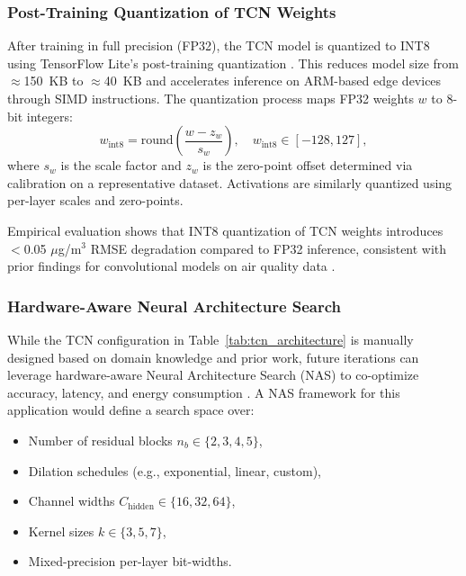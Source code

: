 \subsubsection{Post-Training Quantization of TCN Weights}

After training in full precision (FP32), the TCN model is quantized to INT8 using TensorFlow Lite's post-training quantization \cite{tensorflow2021ptq}. This reduces model size from $\approx$150~KB to $\approx$40~KB and accelerates inference on ARM-based edge devices through SIMD instructions. The quantization process maps FP32 weights $w$ to 8-bit integers:
\begin{equation}
w_{\text{int8}} = \text{round}\left( \frac{w - z_w}{s_w} \right), \quad w_{\text{int8}} \in [-128, 127],
\label{eq:weight_quantization}
\end{equation}
where $s_w$ is the scale factor and $z_w$ is the zero-point offset determined via calibration on a representative dataset. Activations are similarly quantized using per-layer scales and zero-points.

Empirical evaluation shows that INT8 quantization of TCN weights introduces $<$0.05 $\mu$g/m$^3$ RMSE degradation compared to FP32 inference, consistent with prior findings for convolutional models on air quality data \cite{mazinani2025air}.

\subsubsection{Hardware-Aware Neural Architecture Search}

While the TCN configuration in Table~\ref{tab:tcn_architecture} is manually designed based on domain knowledge and prior work, future iterations can leverage hardware-aware Neural Architecture Search (NAS) to co-optimize accuracy, latency, and energy consumption \cite{himeur2024edge}. A NAS framework for this application would define a search space over:

\begin{itemize}
\item Number of residual blocks $n_b \in \{2, 3, 4, 5\}$,
\item Dilation schedules (e.g., exponential, linear, custom),
\item Channel widths $C_{\text{hidden}} \in \{16, 32, 64\}$,
\item Kernel sizes $k \in \{3, 5, 7\}$,
\item Mixed-precision per-layer bit-widths.
\end{itemize}

